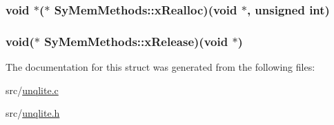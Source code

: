 \hypertarget{struct_sy_mem_methods_a1cb3b69a9c1828ab4b193185a9217cb2}{
\subsubsection[{x\-Realloc}]{\setlength{\rightskip}{0pt plus 5cm}void $\ast$($\ast$ Sy\-Mem\-Methods\-::x\-Realloc)(void $\ast$, unsigned int)}}\label{de/d5d/struct_sy_mem_methods_a1cb3b69a9c1828ab4b193185a9217cb2}
\hypertarget{struct_sy_mem_methods_a24a71f26e436ed86fae0ab8a33bd6388}{
\subsubsection[{x\-Release}]{\setlength{\rightskip}{0pt plus 5cm}void($\ast$ Sy\-Mem\-Methods\-::x\-Release)(void $\ast$)}}\label{de/d5d/struct_sy_mem_methods_a24a71f26e436ed86fae0ab8a33bd6388}


The documentation for this struct was generated from the following files\-:\begin{DoxyCompactItemize}
\item 
src/\hyperlink{unqlite_8c}{unqlite.\-c}\item 
src/\hyperlink{unqlite_8h}{unqlite.\-h}\end{DoxyCompactItemize}
